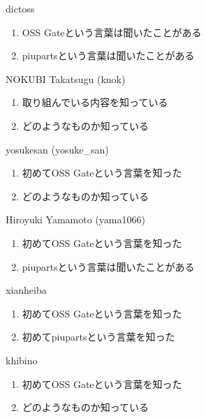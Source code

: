 \begin{prework}{ dictoss }
  \begin{enumerate}
  \item OSS Gateという言葉は聞いたことがある
  \item piupartsという言葉は聞いたことがある
  \end{enumerate}
\end{prework}

\begin{prework}{ NOKUBI Takatsugu (knok) }
  \begin{enumerate}
  \item 取り組んでいる内容を知っている
  \item どのようなものか知っている
  \end{enumerate}
\end{prework}

\begin{prework}{ yosukesan (yosuke\_san) }
  \begin{enumerate}
  \item 初めてOSS Gateという言葉を知った
  \item どのようなものか知っている
  \end{enumerate}
\end{prework}

\begin{prework}{ Hiroyuki Yamamoto (yama1066) }
  \begin{enumerate}
  \item 初めてOSS Gateという言葉を知った
  \item piupartsという言葉は聞いたことがある
  \end{enumerate}
\end{prework}

\begin{prework}{ xianheiba }
  \begin{enumerate}
  \item 初めてOSS Gateという言葉を知った
  \item 初めてpiupartsという言葉を知った
  \end{enumerate}
\end{prework}

\begin{prework}{ khibino }
  \begin{enumerate}
  \item 初めてOSS Gateという言葉を知った
  \item どのようなものか知っている
  \end{enumerate}
\end{prework}

